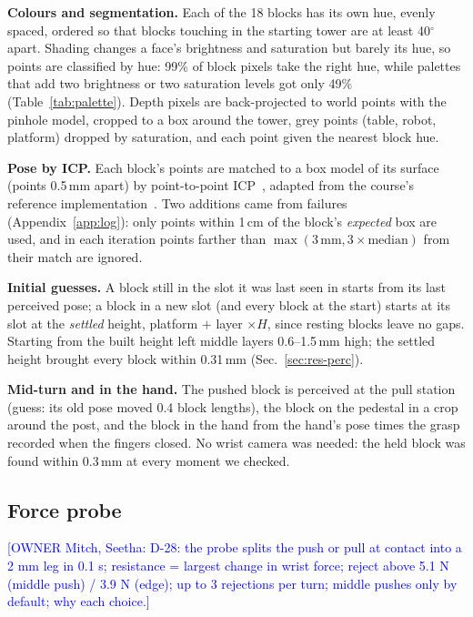 \documentclass[conference]{IEEEtran}
\newcommand{\owner}[2]{\textcolor{blue}{[OWNER #1: #2]}}
\begin{document}
\textbf{Colours and segmentation.} Each of the 18 blocks has its own hue, evenly spaced, ordered so that blocks touching
in the starting tower are at least 40$^\circ$ apart. Shading changes a face's brightness and saturation but barely its
hue, so points are classified by hue: 99\% of block pixels take the right hue, while palettes that add two brightness or
two saturation levels got only 49\% (Table~\ref{tab:palette}). Depth pixels are back-projected to world points with
the pinhole model, cropped to a box around the tower, grey points (table, robot, platform) dropped by saturation, and
each point given the nearest block hue.

\textbf{Pose by ICP.} Each block's points are matched to a box model of its surface (points 0.5\,mm apart) by
point-to-point ICP~\cite{besl1992,arun1987}, adapted from the course's reference implementation~\cite{tedrake_manip}.
Two additions came from failures (Appendix~\ref{app:log}): only points within 1\,cm of the block's \emph{expected} box
are used, and in each iteration points farther than $\max(3\,\text{mm}, 3\times\text{median})$ from their match are
ignored.

\textbf{Initial guesses.} A block still in the slot it was last seen in starts from its last perceived pose; a block in
a new slot (and every block at the start) starts at its slot at the \emph{settled} height, platform $+$ layer $\times H$,
since resting blocks leave no gaps. Starting from the built height left middle layers 0.6--1.5\,mm high; the settled
height brought every block within 0.31\,mm (Sec.~\ref{sec:res-perc}).

\textbf{Mid-turn and in the hand.} The pushed block is perceived at the pull station (guess: its old pose moved 0.4 block
lengths), the block on the pedestal in a crop around the post, and the block in the hand from the hand's pose times the
grasp recorded when the fingers closed. No wrist camera was needed: the held block was found within 0.3\,mm at every
moment we checked.

\subsection{Force probe}
\owner{Mitch, Seetha}{D-28: the probe splits the push or pull at contact into a 2 mm leg in 0.1 s; resistance = largest
change in wrist force; reject above 5.1 N (middle push) / 3.9 N (edge); up to 3 rejections per turn; middle pushes
only by default; why each choice.}

\end{document}
